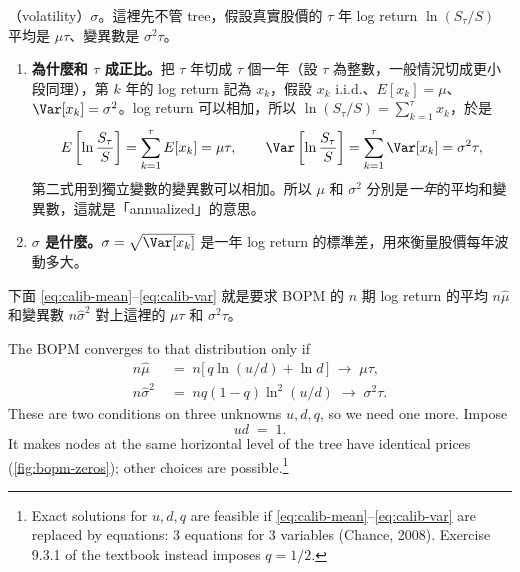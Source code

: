 \suppstart
\begin{remark}
	（volatility）$\sigma$。這裡先不管 tree，假設真實股價的 $\tau$ 年 log return $\ln(S_{\tau}/S)$ 平均是 $\mu\tau$、變異數是 $\sigma^{2}\tau$。
	\begin{enumerate}[(1),nosep]
		\item \textbf{為什麼和 $\tau$ 成正比。}把 $\tau$ 年切成 $\tau$ 個一年（設 $\tau$ 為整數，一般情況切成更小段同理），第 $k$ 年的 log return 記為 $x_{k}$，假設 $x_{k}$ i.i.d.、$E[x_{k}]=\mu$、$\Var[x_{k}]=\sigma^{2}$。log return 可以相加，所以 $\ln(S_{\tau}/S)=\sum_{k=1}^{\tau}x_{k}$，於是
		\[
			E\left[\ln\frac{S_{\tau}}{S}\right]=\sum_{k=1}^{\tau}E[x_{k}]=\mu\tau ,
			\qquad
			\Var\left[\ln\frac{S_{\tau}}{S}\right]=\sum_{k=1}^{\tau}\Var[x_{k}]=\sigma^{2}\tau ,
		\]
		第二式用到獨立變數的變異數可以相加。所以 $\mu$ 和 $\sigma^{2}$ 分別是\emph{一年}的平均和變異數，這就是「annualized」的意思。
		\item \textbf{$\sigma$ 是什麼。}$\sigma=\sqrt{\Var[x_{k}]}$ 是一年 log return 的標準差，用來衡量股價每年波動多大。
	\end{enumerate}
	下面 \eqref{eq:calib-mean}--\eqref{eq:calib-var} 就是要求 BOPM 的 $n$ 期 log return 的平均 $n\hat{\mu}$ 和變異數 $n\hat{\sigma}^{2}$ 對上這裡的 $\mu\tau$ 和 $\sigma^{2}\tau$。
\end{remark}
\suppend

The BOPM converges to that distribution only if
\begin{align}
	n\hat{\mu}      & \;=\; n\bigl[\,q\ln(u/d)+\ln d\,\bigr] \;\to\; \mu\tau ,         \label{eq:calib-mean} \\
	n\hat{\sigma}^{2} & \;=\; nq(1-q)\ln^{2}(u/d) \;\to\; \sigma^{2}\tau .           \label{eq:calib-var}
\end{align}
These are two conditions on three unknowns $u,d,q$, so we need one more.
Impose
\[
	ud \;=\; 1 .
\]
It makes nodes at the same horizontal level of the tree have identical prices (\autoref{fig:bopm-zeros}); other choices are possible.\footnote{Exact solutions for $u,d,q$ are feasible if \eqref{eq:calib-mean}--\eqref{eq:calib-var} are replaced by equations: 3 equations for 3 variables (Chance, 2008). Exercise 9.3.1 of the textbook instead imposes $q=1/2$.}


